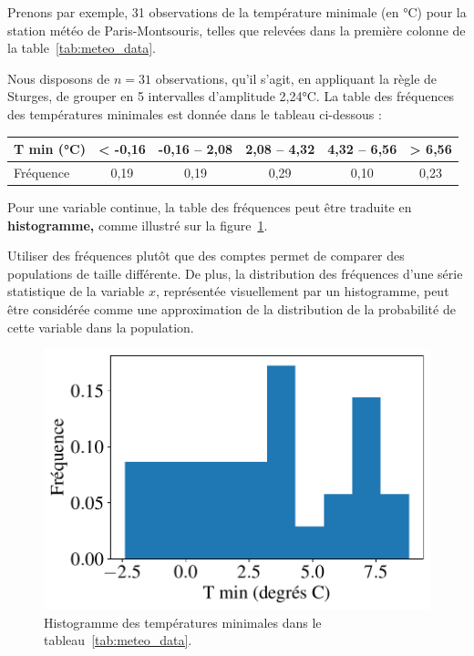 \begin{exemple}
  Prenons par exemple, 31 observations de la température minimale (en
  \si{\celsius}) pour la station météo de Paris-Montsouris, telles que relevées
  dans la première colonne de la table~\ref{tab:meteo_data}.

  Nous disposons de $n=31$ observations, qu'il s'agit, en appliquant la règle de
  Sturges, de grouper en 5 intervalles d'amplitude 2,24\si{\celsius}. La table
  des fréquences des températures minimales est donnée dans le
  tableau ci-dessous : \par %

    \centering
    \begin{tabular}[h]{|l|c|c|c|c|c|} \hline 
      T min (\si{\celsius}) & < -0,16 & -0,16 -- 2,08 & 2,08 -- 4,32 & 4,32 -- 6,56 & > 6,56 \\ \hline 
      Fréquence & 0,19 & 0,19 & 0,29 & 0,10 & 0,23 \\ \hline
    \end{tabular}

\end{exemple}

Pour une variable continue, la table des fréquences peut être traduite en
\textbf{histogramme,} comme illustré sur la figure~\ref{fig:meteo_tmin_hist}.

Utiliser des fréquences plutôt que des comptes permet de comparer des
populations de taille différente. De plus, la distribution des fréquences
d'une série statistique de la variable $x$, représentée visuellement par un
histogramme, peut être considérée comme une approximation de la distribution de
la probabilité de cette variable dans la population.

\begin{figure}[h]
  \centering
  \includegraphics[width=.5\textwidth]{figures/stats/meteo_tmin_hist}
  \caption{Histogramme des températures minimales dans le
    tableau~\ref{tab:meteo_data}.}
  \label{fig:meteo_tmin_hist}
\end{figure}


